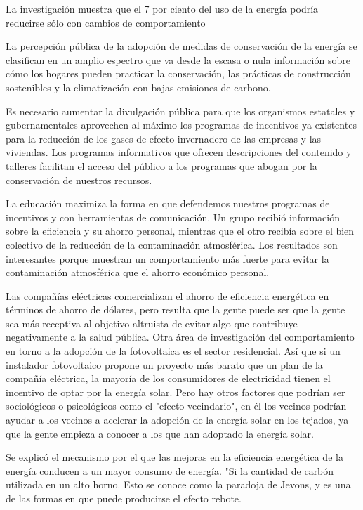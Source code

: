 \documentclass{article}
\begin{document}
La investigación muestra que el 7 por ciento del uso de la energía podría reducirse sólo con cambios de comportamiento


La percepción pública de la adopción de medidas de conservación de la energía se clasifican en un amplio espectro que va desde la escasa o nula información sobre cómo los hogares pueden practicar la conservación, las prácticas de construcción sostenibles y la climatización con bajas emisiones de carbono. 


Es necesario aumentar la divulgación pública para que los organismos estatales y gubernamentales aprovechen al máximo los programas de incentivos ya existentes para la reducción de los gases de efecto invernadero de las empresas y las viviendas. Los programas informativos que ofrecen descripciones del contenido y talleres facilitan el acceso del público a los programas que abogan por la conservación de nuestros recursos.


La educación maximiza la forma en que defendemos nuestros programas de incentivos y con herramientas de comunicación.
Un grupo recibió información sobre la eficiencia y su ahorro personal, mientras que el otro recibía sobre el bien colectivo de la reducción de la contaminación atmosférica. Los resultados son interesantes porque muestran un comportamiento más fuerte para evitar la contaminación atmosférica que el ahorro económico personal.


Las compañías eléctricas comercializan el ahorro de eficiencia energética en términos de ahorro de dólares, pero resulta que la gente puede ser que la gente sea más receptiva al objetivo altruista de evitar algo que contribuye negativamente a la salud pública.
Otra área de investigación del comportamiento en torno a la adopción de la fotovoltaica es el sector residencial.
Así que si un instalador fotovoltaico propone un proyecto más barato que un plan de la compañía eléctrica, la mayoría de los consumidores de electricidad tienen el incentivo de optar por la energía solar.
Pero hay otros factores que podrían ser sociológicos o psicológicos como el "efecto vecindario", en él los vecinos podrían ayudar a los vecinos a acelerar la adopción de la energía solar en los tejados, ya que la gente empieza a conocer a los que han adoptado la energía solar.


Se explicó el mecanismo por el que las mejoras en la eficiencia energética de la energía conducen a un mayor consumo de energía. "Si la cantidad de carbón utilizada en un alto horno. Esto se conoce como la paradoja de Jevons, y es una de las formas en que puede producirse el efecto rebote.
\end{document}
